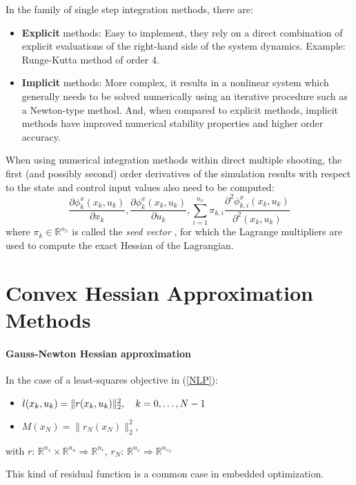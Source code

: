 \documentclass{thesisreport}
\begin{document}
In the family of single step integration methods, there are: 
    \begin{itemize}
        \item \textbf{Explicit} methods: Easy to implement, they rely on a direct combination of explicit evaluations of the right-hand side of the system dynamics. Example: Runge-Kutta method of order 4.
        \item \textbf{Implicit} methods: More complex, it results in a nonlinear system which generally needs to be solved numerically using an iterative procedure such as a Newton-type method. And, when compared to explicit methods, implicit methods have improved numerical stability properties and higher order accuracy.
    \end{itemize}


When using numerical integration methods within direct multiple shooting, the first (and possibly second) order derivatives of the simulation
results with respect to the state and control input values also need to be computed:
    $$ \frac{\partial \phi_k^x (x_k, u_k)}{\partial x_k}, \frac{\partial \phi_k^x (x_k, u_k)}{\partial u_k}, \sum_{i=1}^{n_x} \pi_{k,i} \frac{\partial^2 \phi_{k,i}^x (x_k, u_k)}{\partial^2 (x_k, u_k)} $$
    where $\pi_k \in \mathbb{R}^{n_x}$ is called the \textit{seed vector} \cite{acados2019}, for which the Lagrange multipliers are used to compute the exact Hessian of the Lagrangian.

\newpage

\section{Convex Hessian Approximation Methods}

    \paragraph{Gauss-Newton Hessian approximation} In the case of a least-squares objective in (\ref{NLP}):
    \begin{itemize}
        \item $l(x_k, u_k) = \|r(x_k, u_k) \|_2^2, \text{\space \space \space} k=0, \ldots, N-1$
        \item $M(x_N) = \|r_N (x_N)\|_2^2$,
    \end{itemize}
    with $r$: $\mathbb{R}^{n_x} \times \mathbb{R}^{n_u} \Rightarrow \mathbb{R}^{n_r}$, $r_N$: $\mathbb{R}^{n_x} \Rightarrow \mathbb{R}^{n_{r_N}}$

This kind of residual function is a common case in embedded optimization.
\end{document}
